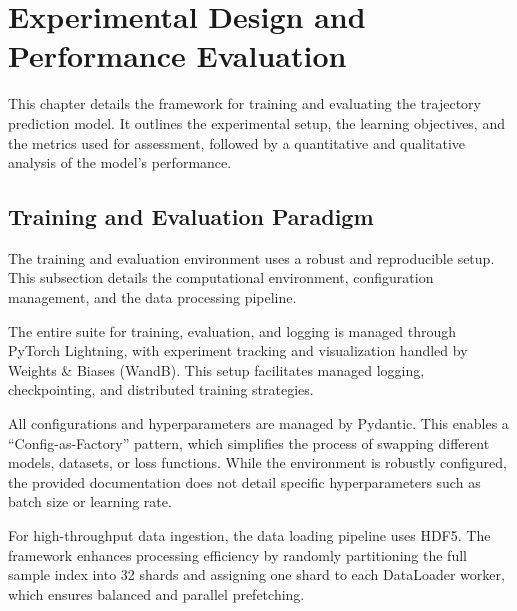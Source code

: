 \section{Experimental Design and Performance Evaluation}
\label{ch:experimental_design_and_results}

This chapter details the framework for training and evaluating the trajectory prediction model. It outlines the experimental setup, the learning objectives, and the metrics used for assessment, followed by a quantitative and qualitative analysis of the model's performance.

\subsection{Training and Evaluation Paradigm}
\label{sec:training_and_evaluation_paradigm}

The training and evaluation environment uses a robust and reproducible setup. This subsection details the computational environment, configuration management, and the data processing pipeline.

\label{sec:exp_training_env_merged}

The entire suite for training, evaluation, and logging is managed through PyTorch Lightning, with experiment tracking and visualization handled by Weights \& Biases (WandB). This setup facilitates managed logging, checkpointing, and distributed training strategies.

All configurations and hyperparameters are managed by Pydantic. This enables a ``Config-as-Factory'' pattern, which simplifies the process of swapping different models, datasets, or loss functions. While the environment is robustly configured, the provided documentation does not detail specific hyperparameters such as batch size or learning rate.

\label{sec:data_handling_merged}

For high-throughput data ingestion, the data loading pipeline uses HDF5. The framework enhances processing efficiency by randomly partitioning the full sample index into 32 shards and assigning one shard to each DataLoader worker, which ensures balanced and parallel prefetching.

